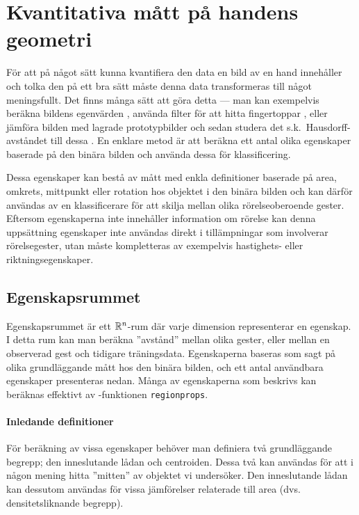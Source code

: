 \documentclass[../rapport_MVEX01-11-05]{subfiles}
\begin{document}
\section{Kvantitativa mått på handens geometri}\label{sec:features}

För att på något sätt kunna kvantifiera den data en bild av en hand 
innehåller och tolka den på ett bra sätt måste denna data transformeras till
något meningsfullt. Det finns många sätt att göra detta --- man kan exempelvis
beräkna bildens egenvärden \cite{Funck02}, använda filter för att hitta
fingertoppar \cite{Noelker97}, eller jämföra bilden med lagrade prototypbilder
och sedan studera det s.k.~Hausdorff-avståndet till dessa \cite{Nielsen04}.
En enklare metod
är att beräkna ett antal olika egenskaper baserade på den binära bilden
och använda dessa för klassificering.

Dessa egenskaper kan bestå av mått med enkla definitioner baserade på area,
omkrets, mittpunkt eller rotation hos objektet i den binära bilden och kan
därför användas av en klassificerare för att skilja mellan olika rörelseoberoende
gester. Eftersom egenskaperna inte innehåller information om rörelse kan denna
uppsättning egenskaper inte användas direkt i tillämpningar som involverar
rörelsegester, utan måste kompletteras av exempelvis hastighets- eller
riktningsegenskaper.

\subsection{Egenskapsrummet}
Egenskapsrummet är ett $\mathbb{R}^n$-rum där varje dimension representerar en
egenskap. I detta rum kan man beräkna ''avstånd'' mellan olika gester,
eller mellan en observerad gest och tidigare träningsdata. Egenskaperna baseras som sagt
på olika grundläggande mått hos den binära bilden, och ett antal användbara
egenskaper presenteras nedan.
Många av egenskaperna som beskrivs kan beräknas effektivt av
\MATLAB-funktionen \texttt{regionprops}.

\paragraph{Inledande definitioner}

För beräkning av vissa egenskaper behöver man definiera två
grundläggande begrepp; den inneslutande lådan och centroiden. Dessa
två kan användas för att i någon mening hitta ''mitten'' av objektet
vi undersöker. Den inneslutande lådan kan dessutom användas för vissa
jämförelser relaterade till area (dvs. densitetsliknande begrepp).
\end{document}
